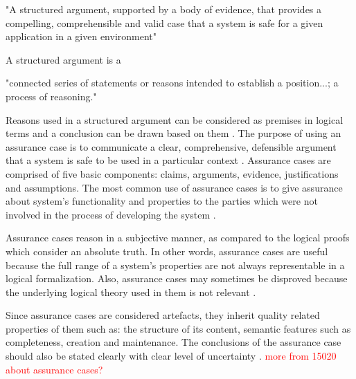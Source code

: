 \begin{displayquote}[][]
"A structured argument, supported by a body of evidence, that provides a compelling, comprehensible and valid case that a system is safe for a given application in a given environment"
\end{displayquote}
A structured argument is a \cite{Omg2010}
\begin{displayquote}[][]
"connected series of statements or reasons intended to establish a position...; a process of reasoning."
\end{displayquote}
Reasons used in a structured argument can be considered as premises in logical terms and a conclusion can be drawn based on them \cite{Omg2010}.  
The purpose of using an assurance case is to communicate a clear, comprehensive, defensible argument that a system is safe to be used in a particular context \cite{gsn2004Kelly}. Assurance cases are comprised of five basic components: claims, arguments, evidence, justifications and assumptions. The most common use of assurance cases is to give assurance about system's functionality and properties to the parties which were not involved in the process of developing the system \cite{iso15026-1-2019}.

Assurance cases reason in a subjective manner, as compared to the logical proofs which consider an absolute truth. In other words, assurance cases are useful because the full range of a system's properties are not always representable in a logical formalization. Also, assurance cases may sometimes be disproved because the underlying logical theory used in them is not relevant \cite{iso15026-1-2019}.

Since assurance cases are considered artefacts, they inherit quality related properties of them such as: the structure of its content, semantic features such as completeness, creation and maintenance. The conclusions of the assurance case should also be stated clearly with clear level of uncertainty \cite{iso15026-1-2019}. \textcolor{red}{more from 15020 about assurance cases?}

